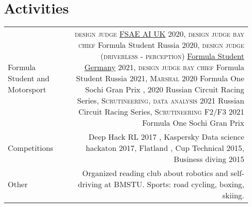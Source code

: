 \section*{\sectionformat Activities}
\begin{tabular}{@{}L!{\VRule}R}
    Formula Student and Motorsport &
    {\textsc{design judge}} \href{https://www.imeche.org/events/formula-student/team-information/fs-ai}{FSAE AI UK} 2020,
    {\textsc{design judge bay chief}} Formula Student Russia 2020,
    {\textsc{design judge (driverless - perception)}} \href{https://www.formulastudent.de/fsg/}{Formula Student Germany} 2021,
    {\textsc{design judge bay chief}} Formula Student Russia 2021,
    {\textsc{Marshal}} 2020 Formula One Sochi Gran Prix , 2020 Russian Circuit Racing Series,
    {\textsc{Scrutineering, data analysis}} 2021 Russian Circuit Racing Series,
    {\textsc{Scrutineering F2/F3}} 2021 Formula One Sochi Gran Prix
    \\
    Competitions                   &
    Deep Hack RL 2017 ,
    Kaspersky Data science hackaton 2017,
    Flatland ,
    Cup Technical 2015,
    Business diving 2015
    \\
    Other                          &
    Organized reading club about robotics and self-driving at BMSTU.
    Sports: road cycling, boxing, skiing.
\end{tabular}